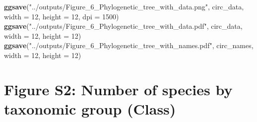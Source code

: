 \documentclass[
]{article}
\newenvironment{Shaded}{\begin{snugshade}}{\end{snugshade}}
\newcommand{\AttributeTok}[1]{\textcolor[rgb]{0.13,0.29,0.53}{#1}}
\newcommand{\DecValTok}[1]{\textcolor[rgb]{0.00,0.00,0.81}{#1}}
\newcommand{\FunctionTok}[1]{\textcolor[rgb]{0.13,0.29,0.53}{\textbf{#1}}}
\newcommand{\NormalTok}[1]{#1}
\newcommand{\StringTok}[1]{\textcolor[rgb]{0.31,0.60,0.02}{#1}}
\begin{document}
\begin{Shaded}
\begin{Highlighting}[]
\FunctionTok{ggsave}\NormalTok{(}\StringTok{"../outputs/Figure\_6\_Phylogenetic\_tree\_with\_data.png"}\NormalTok{, circ\_data, }\AttributeTok{width =} \DecValTok{12}\NormalTok{, }\AttributeTok{height =} \DecValTok{12}\NormalTok{, }\AttributeTok{dpi =} \DecValTok{1500}\NormalTok{)}
\FunctionTok{ggsave}\NormalTok{(}\StringTok{"../outputs/Figure\_6\_Phylogenetic\_tree\_with\_data.pdf"}\NormalTok{, circ\_data, }\AttributeTok{width =} \DecValTok{12}\NormalTok{, }\AttributeTok{height =} \DecValTok{12}\NormalTok{)}
\FunctionTok{ggsave}\NormalTok{(}\StringTok{"../outputs/Figure\_6\_Phylogenetic\_tree\_with\_names.pdf"}\NormalTok{, circ\_names, }\AttributeTok{width =} \DecValTok{12}\NormalTok{, }\AttributeTok{height =} \DecValTok{12}\NormalTok{)}
\end{Highlighting}
\end{Shaded}

\section{Figure S2: Number of species by taxonomic group (Class)}\label{figure-s2-number-of-species-by-taxonomic-group-class}
\end{document}
